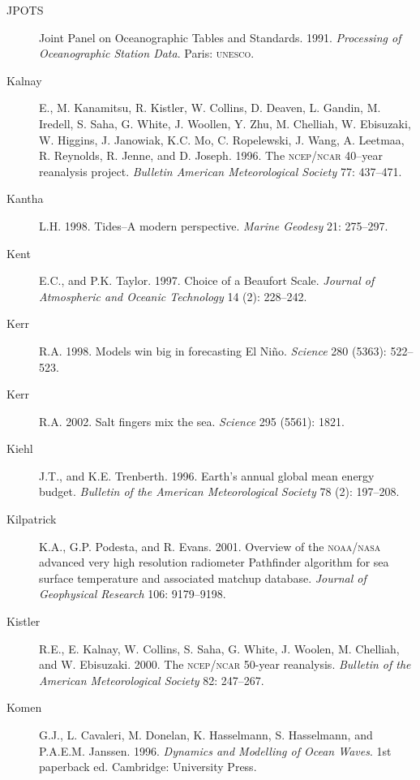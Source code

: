 \begin{description}
\item [JPOTS]Joint Panel on Oceanographic Tables and Standards. 1991. \textit{Processing of Oceanographic Station Data}. Paris: \textsc{unesco}.

\item [Kalnay]E., M. Kanamitsu, R. Kistler, W. Collins, D. Deaven, L. Gandin,
M. Iredell, S. Saha, G. White, J. Woollen, Y. Zhu, M. Chelliah, W. Ebisuzaki, W.
Higgins, J. Janowiak, K.C. Mo, C. Ropelewski, J. Wang, A. Leetmaa, R. Reynolds,
R. Jenne, and D. Joseph. 1996. The \textsc{ncep/ncar} 40--year reanalysis
project. \textit{Bulletin American Meteorological Society} 77: 437--471.

\item[Kantha]L.H. 1998. Tides--A modern perspective. \textit{Marine Geodesy} 21:
275--297.

\item [Kent]E.C., and P.K. Taylor. 1997. Choice of a Beaufort Scale.
\textit{Journal of Atmospheric and Oceanic Technology} 14 (2): 228--242.

\item[Kerr]R.A. 1998. Models win big in forecasting El Ni\~{n}o. \textit{Science} 280
(5363): 522--523.

\item [Kerr]R.A. 2002. Salt fingers mix the sea. \textit{Science} 295 (5561):
1821.

\item [Kiehl]J.T., and K.E. Trenberth. 1996. Earth's annual global mean energy
budget. \textit{Bulletin of the American Meteorological Society} 78 (2):
197--208.

\item [Kilpatrick]K.A., G.P. Podesta, and R. Evans. 2001. Overview of the \textsc{noaa/nasa} advanced very high resolution radiometer Pathfinder algorithm for sea surface temperature and associated
matchup database. \textit{Journal of Geophysical Research} 106: 9179--9198.

\item [Kistler]R.E., E. Kalnay, W. Collins, S. Saha, G. White, J. Woolen, M.
Chelliah, and W. Ebisuzaki. 2000. The \textsc{ncep/ncar} 50-year reanalysis.
\textit{Bulletin of the American Meteorological Society} 82: 247--267.

\item [Komen]G.J., L. Cavaleri, M. Donelan, K. Hasselmann, S. Hasselmann, and
P.A.E.M. Jans\-sen. 1996. \textit{Dynamics and Modelling of Ocean Waves}. 1st
paperback ed.  Cambridge: University Press.


\end{description}
